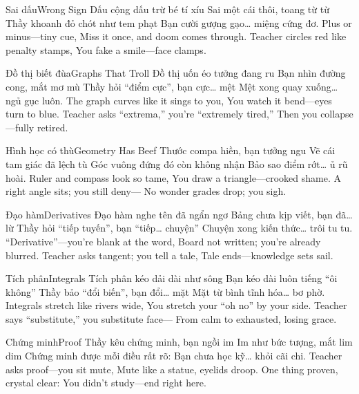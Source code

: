 \begin{tutuyetbox}{Sai dấu}{Wrong Sign}
Dấu cộng dấu trừ bé tí xíu
Sai một cái thôi, toang từ từ
Thầy khoanh đỏ chót như tem phạt
Bạn cười gượng gạo… miệng cứng đơ.
\tcblower
Plus or minus—tiny cue,
Miss it once, and doom comes through.
Teacher circles red like penalty stamps,
You fake a smile—face clamps.
\end{tutuyetbox}

\begin{tutuyetbox}{Đồ thị biết đùa}{Graphs That Troll}
Đồ thị uốn éo tưởng đang ru
Bạn nhìn đường cong, mắt mơ mù
Thầy hỏi “điểm cực”, bạn cực… mệt
Mệt xong quay xuống… ngủ gục luôn.
\tcblower
The graph curves like it sings to you,
You watch it bend—eyes turn to blue.
Teacher asks “extrema,” you’re “extremely tired,”
Then you collapse—fully retired.
\end{tutuyetbox}

\begin{tutuyetbox}{Hình học có thù}{Geometry Has Beef}
Thước compa hiền, bạn tưởng ngu
Vẽ cái tam giác đã lệch tù
Góc vuông đứng đó còn không nhận
Bảo sao điểm rớt… ủ rũ hoài.
\tcblower
Ruler and compass look so tame,
You draw a triangle—crooked shame.
A right angle sits; you still deny—
No wonder grades drop; you sigh.
\end{tutuyetbox}

\begin{tutuyetbox}{Đạo hàm}{Derivatives}
Đạo hàm nghe tên đã ngẩn ngơ
Bảng chưa kịp viết, bạn đã… lừ
Thầy hỏi “tiếp tuyến”, bạn “tiếp… chuyện”
Chuyện xong kiến thức… trôi tu tu.
\tcblower
“Derivative”—you’re blank at the word,
Board not written; you’re already blurred.
Teacher asks tangent; you tell a tale,
Tale ends—knowledge sets sail.
\end{tutuyetbox}

\begin{tutuyetbox}{Tích phân}{Integrals}
Tích phân kéo dải dài như sông
Bạn kéo dài luôn tiếng “ôi không”
Thầy bảo “đổi biến”, bạn đổi… mặt
Mặt từ bình tĩnh hóa… bơ phờ.
\tcblower
Integrals stretch like rivers wide,
You stretch your “oh no” by your side.
Teacher says “substitute,” you substitute face—
From calm to exhausted, losing grace.
\end{tutuyetbox}

\begin{tutuyetbox}{Chứng minh}{Proof}
Thầy kêu chứng minh, bạn ngồi im
Im như bức tượng, mắt lim dim
Chứng minh được mỗi điều rất rõ:
Bạn chưa học kỹ… khỏi cãi chi.
\tcblower
Teacher asks proof—you sit mute,
Mute like a statue, eyelids droop.
One thing proven, crystal clear:
You didn’t study—end right here.
\end{tutuyetbox}

